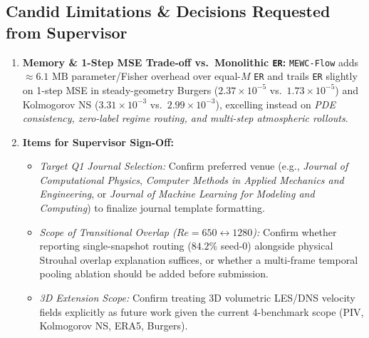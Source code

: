 \documentclass[11pt,a4paper]{article}
\begin{document}
\subsection*{Candid Limitations \& Decisions Requested from Supervisor}
\begin{enumerate}
  \item \textbf{Memory \& 1-Step MSE Trade-off vs.\ Monolithic \texttt{ER}:} \texttt{MEWC-Flow} adds $\approx 6.1\text{ MB}$ parameter/Fisher overhead over equal-$M$ \texttt{ER} and trails \texttt{ER} slightly on 1-step MSE in steady-geometry Burgers ($2.37\times 10^{-5}$ vs.\ $1.73\times 10^{-5}$) and Kolmogorov NS ($3.31\times 10^{-3}$ vs.\ $2.99\times 10^{-3}$), excelling instead on \emph{PDE consistency, zero-label regime routing, and multi-step atmospheric rollouts}.
  \item \textbf{Items for Supervisor Sign-Off:}
  \begin{itemize}
    \item \emph{Target Q1 Journal Selection:} Confirm preferred venue (e.g., \textit{Journal of Computational Physics}, \textit{Computer Methods in Applied Mechanics and Engineering}, or \textit{Journal of Machine Learning for Modeling and Computing}) to finalize journal template formatting.
    \item \emph{Scope of Transitional Overlap ($Re=650 \leftrightarrow 1280$):} Confirm whether reporting single-snapshot routing ($84.2\%$ seed-0) alongside physical Strouhal overlap explanation suffices, or whether a multi-frame temporal pooling ablation should be added before submission.
    \item \emph{3D Extension Scope:} Confirm treating 3D volumetric LES/DNS velocity fields explicitly as future work given the current 4-benchmark scope (PIV, Kolmogorov NS, ERA5, Burgers).
  \end{itemize}
\end{enumerate}
\end{document}
